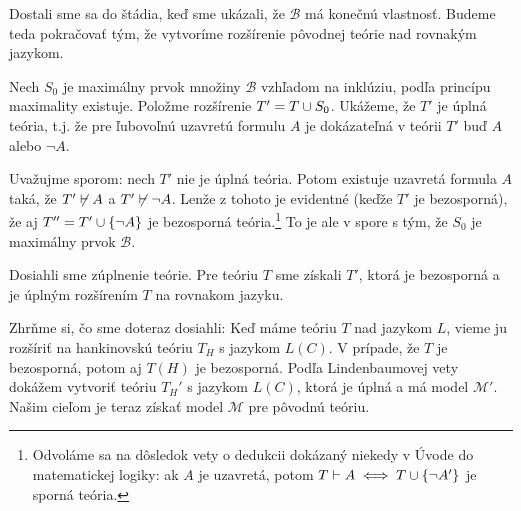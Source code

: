     \begin{dokaz}
    Dostali sme sa do štádia, keď sme ukázali, že $\mathcal{B}$ má
    konečnú vlastnosť. Budeme teda pokračovať tým, že vytvoríme
    rozšírenie pôvodnej teórie nad rovnakým jazykom.

    Nech $S_0$ je maximálny prvok množiny $\mathcal{B}$ vzhľadom na
    inklúziu, podľa princípu maximality existuje.
    Položme rozšírenie $T' = T \cup S_0$. Ukážeme, že $T'$ je úplná
    teória, t.j. že pre ľubovoľnú uzavretú formulu $A$ je dokázateľná
    v teórii $T'$ buď $A$ alebo $\neg A$.

    Uvažujme sporom: nech $T'$ nie je úplná teória. 
    Potom existuje uzavretá formula $A$ taká,
    že $T'\not \vdash A$ a $T' \not \vdash \neg A$.
    Lenže z tohoto je evidentné (keďže $T'$ je bezosporná), že aj
    $T'' = T' \cup \{\neg A\}$ je bezosporná teória.\footnote{
        Odvoláme sa na dôsledok vety o dedukcii dokázaný niekedy v
        Úvode do matematickej logiky: ak $A$ je uzavretá,
        potom $T \vdash A \iff T \cup \{\neg A'\}$ je sporná teória.
    }
    To je ale v spore s tým, že $S_0$ je maximálny prvok $\mathcal{B}$.

    Dosiahli sme zúplnenie teórie. Pre teóriu $T$ sme získali $T'$,
    ktorá je bezosporná a je úplným rozšírením $T$ na rovnakom jazyku.
\end{dokaz}

Zhrňme si, čo sme doteraz dosiahli:
Keď máme teóriu $T$ nad jazykom $L$,
vieme ju rozšíriť na hankinovskú teóriu $T_H$ s jazykom $L(C)$.
V prípade, že $T$ je bezosporná, potom aj $T(H)$ je bezosporná.
Podľa Lindenbaumovej vety dokážem vytvoriť teóriu $T_H'$ s jazykom
$L(C)$, ktorá je úplná a má model $\mathcal{M}'$.
Našim cieľom je teraz získať model $\mathcal{M}$ pre pôvodnú teóriu.


